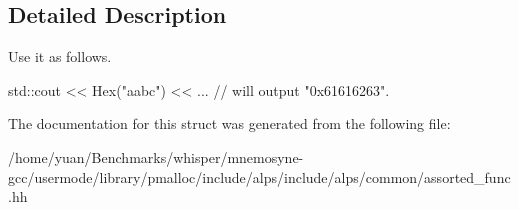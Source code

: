 \subsection{Detailed Description}
Use it as follows. 
\begin{DoxyCode}
std::cout << Hex(\textcolor{stringliteral}{"aabc"}) << ...
\textcolor{comment}{// will output "0x61616263".}
\end{DoxyCode}
 

The documentation for this struct was generated from the following file\+:\begin{DoxyCompactItemize}
\item 
/home/yuan/\+Benchmarks/whisper/mnemosyne-\/gcc/usermode/library/pmalloc/include/alps/include/alps/common/assorted\+\_\+func.\+hh\end{DoxyCompactItemize}
